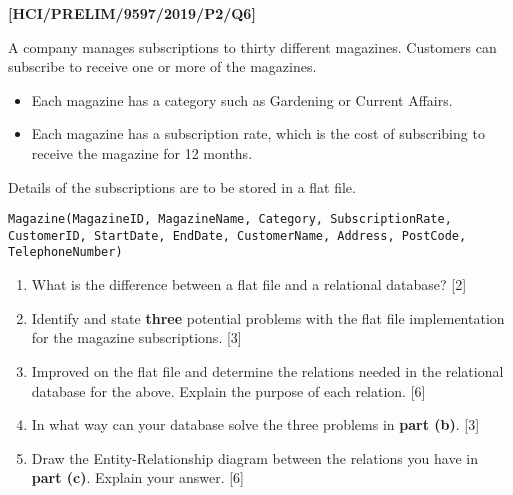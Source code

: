 \item \textbf{{[}HCI/PRELIM/9597/2019/P2/Q6{]} }

A company manages subscriptions to thirty different magazines. Customers
can subscribe to receive one or more of the magazines.
\begin{itemize}
\item Each magazine has a category such as Gardening or Current Affairs. 
\item Each magazine has a subscription rate, which is the cost of subscribing
to receive the magazine for 12 months.
\end{itemize}
Details of the subscriptions are to be stored in a flat file. 

\texttt{Magazine(MagazineID, MagazineName, Category, SubscriptionRate,
CustomerID, StartDate, EndDate, CustomerName, Address, PostCode, TelephoneNumber) }
\begin{enumerate}
\item What is the difference between a flat file and a relational database?
\hfill{} {[}2{]}
\item Identify and state \textbf{three} potential problems with the flat
file implementation for the magazine subscriptions. \hfill{}{[}3{]}
\item Improved on the flat file and determine the relations needed in the
relational database for the above. Explain the purpose of each relation.
\hfill{}{[}6{]}
\item In what way can your database solve the three problems in \textbf{part
(b)}. \hfill{} {[}3{]}
\item Draw the Entity-Relationship diagram between the relations you have
in \textbf{part (c)}. Explain your answer. \hfill{}{[}6{]}
\end{enumerate}